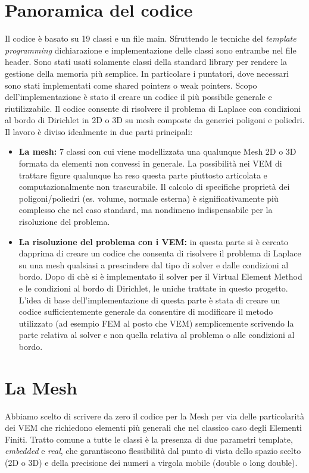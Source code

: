 \documentclass[oneside,12pt]{book}  %
\theoremstyle{plain}
\theoremstyle{definition}
\theoremstyle{remark}
\numberwithin{equation}{chapter} %
\begin{document}
\section{Panoramica del codice}
\label{sec:panoramica}
Il codice \`e basato su 19 classi e un file main. Sfruttendo le
tecniche del \textit{template programming} dichiarazione e
implementazione delle classi sono entrambe nel file header.
Sono stati usati solamente classi della standard library per rendere
la gestione della memoria pi\`u semplice. In particolare i puntatori,
dove necessari sono stati implementati come shared pointers o weak
pointers. 
Scopo dell'implementazione \`e stato il creare un codice il pi\`u
possibile generale e riutilizzabile. Il codice consente di risolvere
il problema di Laplace con condizioni al bordo di Dirichlet in 2D o 3D
su mesh composte da generici poligoni e poliedri.
Il lavoro \`e diviso idealmente in due parti principali:
\begin{itemize}
\item
\textbf{La mesh:} 7 classi con cui viene modellizzata una qualunque
Mesh 2D o 3D formata da elementi non convessi in generale. La
possibilit\`a nei VEM di trattare figure qualunque ha
reso questa parte piuttosto articolata e computazionalmente non
trascurabile. Il calcolo di specifiche propriet\`a dei
poligoni/poliedri (es. volume, normale esterna) \`e significativamente
pi\`u complesso che nel caso standard, ma nondimeno indispensabile per
la risoluzione del problema.

\item
\textbf{La risoluzione del problema con i VEM:} in questa parte si \`e
cercato dapprima di creare un codice che consenta di risolvere il
problema di Laplace su una mesh qualsiasi a prescindere dal tipo di
solver e dalle condizioni al bordo. Dopo di ch\`e si \`e implementato
il solver per il Virtual Element Method e le condizioni al bordo di
Dirichlet, le uniche trattate in questo progetto.
L'idea di base dell'implementazione di questa parte \`e stata di
creare un codice sufficientemente generale da consentire di modificare
il metodo utilizzato (ad esempio FEM al posto che VEM) semplicemente
scrivendo la parte relativa al solver e non quella relativa al
problema o alle condizioni al bordo.

\end{itemize}


\section{La Mesh}
\label{sec:mesh}
Abbiamo scelto di scrivere da zero il codice per la Mesh per via delle
particolarit\`a dei VEM che richiedono elementi pi\`u generali che nel
classico caso degli Elementi Finiti. Tratto comune a tutte le classi
\`e la presenza di due parametri template, \textit{embedded} e
\textit{real}, che garantiscono flessibilit\`a dal punto di vista
dello spazio scelto (2D o 3D) e della precisione dei numeri a virgola
mobile (double o long double). 
\end{document}
